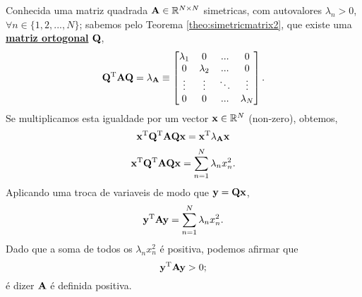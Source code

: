 \begin{myproofT}\label{proof:theo:positivematrix2}
Conhecida uma matriz quadrada $\MATRIX{A} \in \mathbb{R}^{N \times N}$ simetricas,
com  autovalores $\lambda_n>0$, $\forall n \in \{1, 2, ..., N\}$;
sabemos pelo Teorema \ref{theo:simetricmatrix2}, 
que existe uma \hyperref[def:ortogonalmatrix0]{\textbf{matriz ortogonal}} $\MATRIX{Q}$,
\begin{equation}
\MATRIX{Q}^{\transpose}\MATRIX{A}\MATRIX{Q} = \MATRIX{\lambda}_{\MATRIX{A}}\equiv
\begin{bmatrix}
\lambda_1 & 0         & ...    & 0 \\
0         & \lambda_2 & ...    & 0 \\
\vdots    & \vdots    & \ddots & \vdots \\
0         & 0         & ...    & \lambda_N
\end{bmatrix}.
\end{equation}
Se multiplicamos esta igualdade por um vector $\VECTOR{x} \in \mathbb{R}^N$ (non-zero), obtemos,
\begin{equation}
\VECTOR{x}^{\transpose} \MATRIX{Q}^{\transpose}\MATRIX{A}\MATRIX{Q} \VECTOR{x} = 
\VECTOR{x}^{\transpose} \MATRIX{\lambda}_{\MATRIX{A}} \VECTOR{x}
\end{equation}
\begin{equation}
\VECTOR{x}^{\transpose} \MATRIX{Q}^{\transpose}\MATRIX{A}\MATRIX{Q} \VECTOR{x} 
= \sum \limits_{n=1}^{N}\lambda_n x_n^2.
\end{equation}
Aplicando uma troca de variaveis de modo que $\VECTOR{y}=\MATRIX{Q} \VECTOR{x}$,
\begin{equation}
\VECTOR{y}^{\transpose} \MATRIX{A} \VECTOR{y} 
= \sum \limits_{n=1}^{N}\lambda_n x_n^2.
\end{equation}
Dado que a soma de todos os $\lambda_n x_n^2$ é positiva, podemos afirmar que
\begin{equation}
\VECTOR{y}^{\transpose} \MATRIX{A} \VECTOR{y} > 0;
\end{equation}
é dizer $\MATRIX{A}$ é definida positiva.
\end{myproofT}


